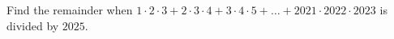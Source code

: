 Find the remainder when $1\cdot2\cdot3+2\cdot3\cdot4+3\cdot4\cdot5+\ldots+2021\cdot2022\cdot2023$ is divided by $2025$.
